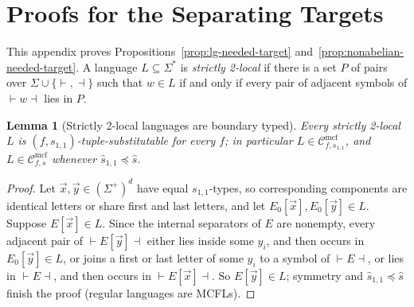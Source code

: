 \documentclass[11pt]{article}
\numberwithin{equation}{section}
\theoremstyle{plain}
\newtheorem{lemma}[theorem]{Lemma}
\theoremstyle{definition}
\theoremstyle{remark}
\newcommand{\Cmcf}[2]{\mathcal{C}^{\mathrm{mcf}}_{#1,#2}}
\newcommand{\tuple}[1]{\vec{#1}}
\theoremstyle{plain}
\begin{document}
\section{Proofs for the Separating Targets}
\label{app:separating-targets}

This appendix proves Propositions~\ref{prop:lg-needed-target}
and~\ref{prop:nonabelian-needed-target}.  A language $L\subseteq\Sigma^*$ is
\emph{strictly 2-local} if there is a set $P$ of pairs over
$\Sigma\cup\{\vdash,\dashv\}$ such that $w\in L$ if and only if every pair of
adjacent symbols of $\vdash w\dashv$ lies in $P$.

\begin{lemma}[Strictly 2-local languages are boundary typed]
\label{lem:sl2-boundary-control}
Every strictly 2-local $L$ is $(f,s_{1,1})$-tuple-substitutable for every $f$; in
particular $L\in\Cmcf{f}{s_{1,1}}$, and $L\in\Cmcf{f}{s}$ whenever
$\widehat s_{1,1}\preceq\widehat s$.
\end{lemma}

\begin{proof}
Let $\tuple x,\tuple y\in(\Sigma^+)^d$ have equal $s_{1,1}$-types, so
corresponding components are identical letters or share first and last letters,
and let $E_0[\tuple x],E_0[\tuple y]\in L$.  Suppose $E[\tuple x]\in L$.  Since the
internal separators of $E$ are nonempty, every adjacent pair of
$\vdash E[\tuple y]\dashv$ either lies inside some $y_i$, and then occurs in
$E_0[\tuple y]\in L$, or joins a first or last letter of some $y_i$ to a symbol of
$\vdash E\dashv$, or lies in $\vdash E\dashv$, and then occurs in
$\vdash E[\tuple x]\dashv$.  So $E[\tuple y]\in L$; symmetry and
$\widehat s_{1,1}\preceq\widehat s$ finish the proof (regular languages are MCFLs).
\end{proof}
\end{document}

